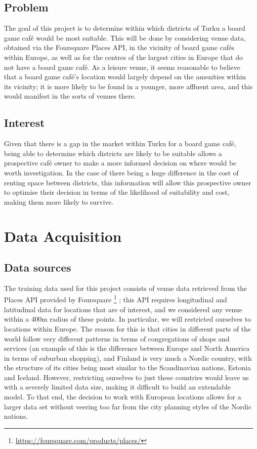 \documentclass{article}
\begin{document}
    \subsection{Problem}

    The goal of this project is to determine within which districts of Turku a board game caf\'e would be most suitable.
    This will be done by considering venue data, obtained via the Foursquare Places API, in the vicinity of board game caf\'es within Europe, as well as for the centres of the largest cities in Europe that do not have a board game caf\'e.
    As a leisure venue, it seems reasonable to believe that a board game caf\'e's location would largely depend on the amenities within its vicinity; it is more likely to be found in a younger, more affluent area, and this would manifest in the sorts of venues there.

    
    \subsection{Interest}

    Given that there is a gap in the market within Turku for a board game caf\'e, being able to determine which districts are likely to be suitable allows a prospective caf\'e owner to make a more informed decision on where would be worth investigation. 
    In the case of there being a huge difference in the cost of renting space between districts, this information will allow this prospective owner to optimise their decision in terms of the likelihood of suitability and cost, making them more likely to survive.

    \section{Data Acquisition}

    \subsection{Data sources}

    The training data used for this project consists of venue data retrieved from the Places API provided by Foursquare%
    \footnote{
        \url{https://foursquare.com/products/places/}
    }%
    ; this API requires longitudinal and latitudinal data for locations that are of interest, and we considered any venue within a 400m radius of these points. 
    In particular, we will restricted ourselves to locations within Europe.
    The reason for this is that cities in different parts of the world follow very different patterns in terms of congregations of shops and services (an example of this is the difference between Europe and North America in terms of suburban shopping), and Finland is very much a Nordic country, with the structure of its cities being most similar to the Scandinavian nations, Estonia and Iceland.
    However, restricting ourselves to just these countries would leave us with a severely limited data size, making it difficult to build an extendable model. 
    To that end, the decision to work with European locations allows for a larger data set without veering too far from the city planning styles of the Nordic nations.\\
    
\end{document}
